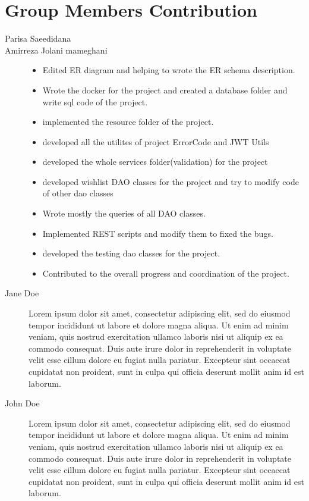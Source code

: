 \section{Group Members Contribution}


\begin{description}
	\item[Parisa Saeedidana]
	    \begin{itemize}
		\end{itemize}
	\item[Amirreza Jolani mameghani] 	    
	\begin{itemize}
		\item Edited ER diagram and helping to wrote the ER schema description.
		\item Wrote the docker for the project and created a database folder and write sql code of the project.
		\item implemented the resource folder of the project.
		\item developed all the utilites of project ErrorCode and JWT Utils
		\item developed the whole services folder(validation) for the project
		\item developed wishlist DAO classes for the project and try to modify code of other dao classes
		\item Wrote mostly the queries of all DAO classes.
		\item Implemented REST scripts and modify them to fixed the bugs.
		\item developed the testing dao classes for the project.
		\item Contributed to the overall progress and coordination of the project.
	\end{itemize}
	\item[Jane Doe] Lorem ipsum dolor sit amet, consectetur adipiscing elit, sed do eiusmod tempor incididunt ut labore et dolore magna aliqua. Ut enim ad minim veniam, quis nostrud exercitation ullamco laboris nisi ut aliquip ex ea commodo consequat. Duis aute irure dolor in reprehenderit in voluptate velit esse cillum dolore eu fugiat nulla pariatur. Excepteur sint occaecat cupidatat non proident, sunt in culpa qui officia deserunt mollit anim id est laborum.
	\item[John Doe] Lorem ipsum dolor sit amet, consectetur adipiscing elit, sed do eiusmod tempor incididunt ut labore et dolore magna aliqua. Ut enim ad minim veniam, quis nostrud exercitation ullamco laboris nisi ut aliquip ex ea commodo consequat. Duis aute irure dolor in reprehenderit in voluptate velit esse cillum dolore eu fugiat nulla pariatur. Excepteur sint occaecat cupidatat non proident, sunt in culpa qui officia deserunt mollit anim id est laborum.

\end{description}
